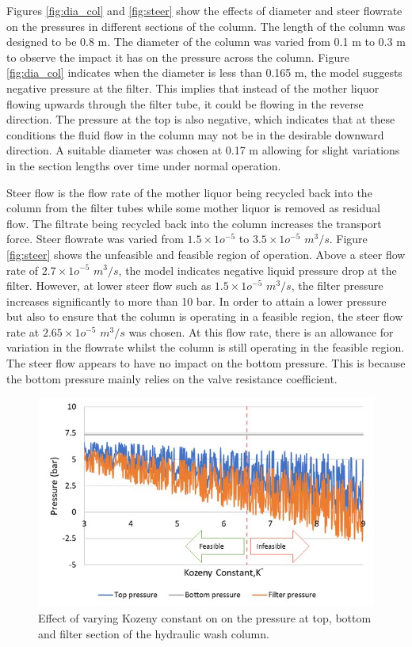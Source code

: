 Figures \ref{fig:dia_col} and \ref{fig:steer} show the effects of diameter and steer flowrate on the pressures in different sections of the column. The length of the column was designed to be 0.8 m. The diameter of the column was varied from 0.1 m to 0.3 m to observe the impact it has on the pressure across the column. Figure \ref{fig:dia_col} indicates when the diameter is less than 0.165 m, the model suggests negative pressure at the filter. This implies that instead of the mother liquor flowing upwards through the filter tube, it could be flowing in the reverse direction. The pressure at the top is also negative, which indicates that at these conditions the fluid flow in the column may not be in the desirable downward direction. A suitable diameter was chosen at 0.17 m allowing for slight variations in the section lengths over time under normal operation.

Steer flow is the flow rate of the mother liquor being recycled back into the column from the filter tubes while some mother liquor is removed as residual flow. The filtrate being recycled back into the column increases the transport force. Steer flowrate was varied from $1.5 \times 1o^{-5}$ to $3.5 \times 1o^{-5}$ $m^{3}/s$. Figure \ref{fig:steer} shows the unfeasible and feasible region of operation. Above a steer flow rate of $2.7 \times 1o^{-5}$ $m^{3}/s$, the model indicates negative liquid pressure drop at the filter. However, at lower steer flow such as $1.5 \times 1o^{-5}$ $m^{3}/s$, the filter pressure increases significantly to more than 10 bar. In order to attain a lower pressure but also to ensure that the column is operating in a feasible region, the steer flow rate at $2.65 \times 1o^{-5}$ $m^{3}/s$ was chosen. At this flow rate, there is an allowance for variation in the flowrate whilst the column is still operating in the feasible region. The steer flow appears to have no impact on the bottom pressure. This is because the bottom pressure mainly relies on the valve resistance coefficient. 

\begin{figure}
\centering
\includegraphics[width=\linewidth]{chapters/3-separation/figures/kozeny.jpg}
\caption{Effect of varying Kozeny constant on  on the pressure at top, bottom and filter section of the hydraulic wash column.}
\label{fig:koz_col}
\end{figure}

